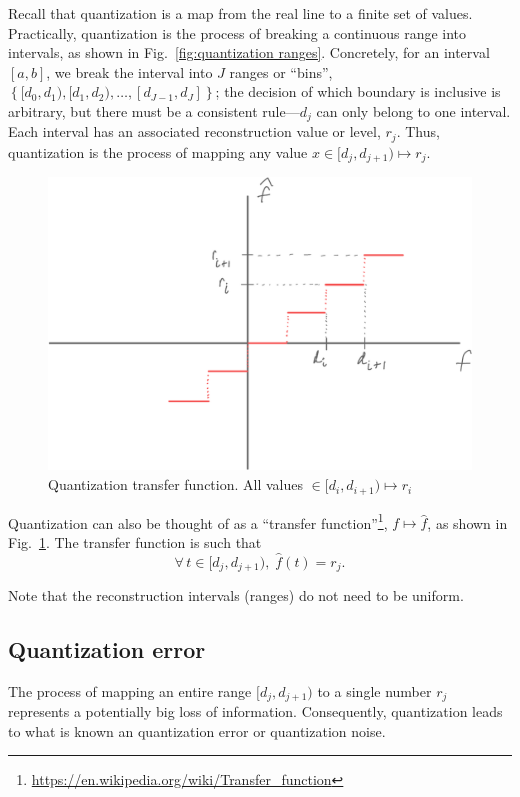 \documentclass[11pt]{article}
\newcommand{\figref}[1]{Fig.~\ref{#1}}
\begin{document}
Recall that quantization is a map from the real line to a finite set of values. Practically, quantization is the process of breaking a continuous range into intervals, as shown in \figref{fig:quantization ranges}. Concretely, for an interval $[a,b]$, we break the interval into $J$ ranges or ``bins'', $\left\{[d_0, d_1), [d_1, d_2),\dotsc,[d_{J-1},d_J]\right\}$; the decision of which boundary is inclusive is arbitrary, but there must be a consistent rule---$d_j$ can only belong to one interval. Each interval has an associated reconstruction value or level, $r_j$. Thus, quantization is the process of mapping any value $x \in [d_j, d_{j+1}) \mapsto r_j$.

\begin{figure}
    \centering
    \includegraphics[width=\textwidth]{../figures/lecture01/quantization-transfer-function.pdf}
    \caption{Quantization transfer function. All values $\in [d_i, d_{i+1}) \mapsto r_i$}
    \label{fig:quantization transfer function}
\end{figure}

Quantization can also be thought of as a ``transfer function''\footnote{\href{https://en.wikipedia.org/wiki/Transfer_function}{https://en.wikipedia.org/wiki/Transfer\_function}}, $f \mapsto \hat{f}$, as shown in \figref{fig:quantization transfer function}. The transfer function is such that
\begin{equation}
    \forall \, t \in [d_j, d_{j+1}), \; \hat{f}(t) = r_j.
\end{equation}

Note that the reconstruction intervals (ranges) do not need to be uniform.

\subsection{Quantization error}
The process of mapping an entire range $[d_j,d_{j+1})$ to a single number $r_j$ represents a potentially big loss of information. Consequently, quantization leads to what is known an quantization error or quantization noise.
\end{document}
